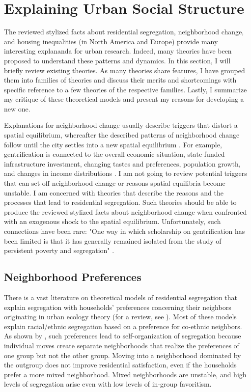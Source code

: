 \documentclass[a4paper,12pt]{article}
\begin{document}
\section{Explaining Urban Social Structure}


The reviewed stylized facts about residential segregation, neighborhood change, and housing inequalities (in North America and Europe) provide many interesting explananda for urban research. Indeed, many theories have been proposed to understand these patterns and dynamics. In this section, I will briefly review existing theories. As many theories share features, I have grouped them into families of theories and discuss their merits and shortcomings with specific reference to a few theories of the respective families. Lastly, I summarize my critique of these theoretical models and present my reasons for developing a new one.

Explanations for neighborhood change usually describe triggers that distort a spatial equilibrium, whereafter the described patterns of neighborhood change follow until the city settles into a new spatial equilibrium \citep{galsterNatureNeighbourhood2001}. For example, gentrification is connected to the overall economic situation, state-funded infrastructure investment, changing tastes and preferences, population growth, and changes in income distributions \citep{leyAlternativeExplanationsInnerCity1986, zukinGentrificationCultureCapital1987}. I am not going to review potential triggers that can set off neighborhood change or reasons spatial equilibria become unstable. I am concerned with theories that describe the reasons and the processes that lead to residential segregation. Such theories should be able to produce the reviewed stylized facts about neighborhood change when confronted with an exogenous shock to the spatial equilibrium. Unfortunately, such connections have been rare: "One way in which scholarship on gentrification has been limited is that it has generally remained isolated from the study of persistent poverty and segregation" \citep[227]{hwangThingsChangeThings2016}.


\subsection{Neighborhood Preferences}

There is a vast literature on theoretical models of residential segregation that explain segregation with households' preferences concerning their neighbors originating in urban ecology theory (for a review, see \cite{fossettEthnicPreferencesSocial2006}). Most of these models explain racial/ethnic segregation based on a preference for co-ethnic neighbors. As shown by \citet{schellingDynamicModelsSegregation1971}, such preferences lead to self-organization of segregation because individual moves create separate neighborhoods that realize the preferences of one group but not the other group. Moving into a neighborhood dominated by the outgroup does not improve residential satisfaction, even if the households prefer a more mixed neighborhood. Mixed neighborhoods are unstable, and high levels of segregation arise even with low levels of in-group favoritism.
\end{document}
